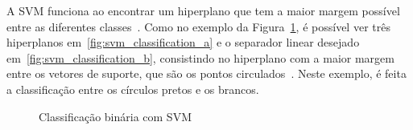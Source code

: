 A SVM funciona ao encontrar um hiperplano que tem a maior margem possível entre as diferentes classes~\cite{hearst:1998}. Como no exemplo da Figura~\ref{fig:svm_classification}, é possível ver três hiperplanos em~\ref{fig:svm_classification_a} e o separador linear desejado em~\ref{fig:svm_classification_b}, consistindo no hiperplano com a maior margem entre os vetores de suporte, que são os pontos circulados~\cite{russell:2010}. Neste exemplo, é feita a classificação entre os círculos pretos e os brancos.

\begin{figure}[ht]
    \centering
    \caption{Classificação binária com SVM}
    \label{fig:svm_classification}
        \hspace{0.2cm}
\end{figure}


